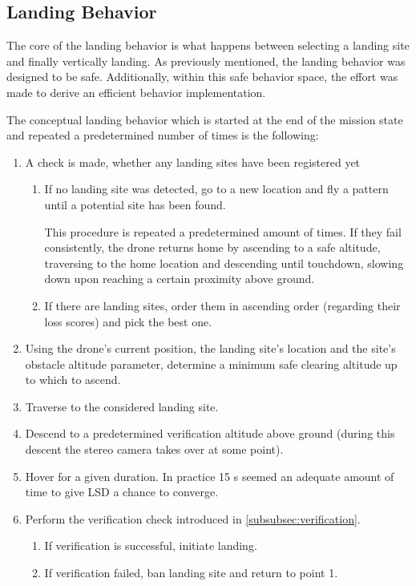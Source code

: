 \subsection{Landing Behavior}\label{subsec:landing_behavior}

The core of the landing behavior is what happens between selecting a landing site and finally vertically landing. As previously mentioned, the landing behavior was designed to be safe. Additionally, within this safe behavior space, the effort was made to derive an efficient behavior implementation.

The conceptual landing behavior which is started at the end of the mission state and repeated a predetermined number of times is the following:

\begin{enumerate}
    \item A check is made, whether any landing sites have been registered yet
    \begin{enumerate}
        \item If no landing site was detected, go to a new location and fly a pattern until a potential site has been found.

        This procedure is repeated a predetermined amount of times. If they fail consistently, the drone returns home by ascending to a safe altitude, traversing to the home location and descending until touchdown, slowing down upon reaching a certain proximity above ground.
        \item If there are landing sites, order them in ascending order (regarding their loss scores) and pick the best one.
    \end{enumerate}
    \item Using the drone's current position, the landing site's location and the site's obstacle altitude parameter, determine a minimum safe clearing altitude up to which to ascend.
    \item Traverse to the considered landing site.
    \item Descend to a predetermined verification altitude above ground (during this descent the stereo camera takes over at some point).
    \item Hover for a given duration. In practice 15 s seemed an adequate amount of time to give LSD a chance to converge.
    \item Perform the verification check introduced in \cref{subsubsec:verification}.
    \begin{enumerate}
        \item If verification is successful, initiate landing.
        \item If verification failed, ban landing site and return to point 1.
    \end{enumerate}
\end{enumerate}

